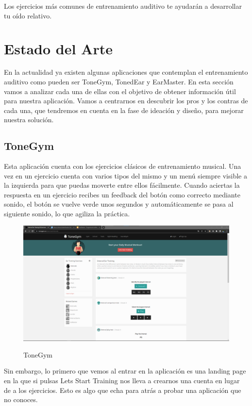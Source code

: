 \documentclass[12pt,twoside,titlepage]{report}
\begin{document}
Los ejercicios más comunes de entrenamiento auditivo te ayudarán a desarrollar tu oído relativo.

\section{Estado del Arte}

En la actualidad ya existen algunas aplicaciones que contemplan el entrenamiento auditivo como pueden ser ToneGym, TonedEar y EarMaster. En esta sección vamos a analizar cada una de ellas con el objetivo de obtener información útil para nuestra aplicación. Vamos a centrarnos en descubrir los pros y los contras de cada una, que tendremos en cuenta en la fase de ideación y diseño, para mejorar nuestra solución.

\subsection{ToneGym}

Esta aplicación cuenta con los ejercicios clásicos de entrenamiento musical. Una vez en un ejercicio cuenta con varios tipos del mismo y un menú siempre visible a la izquierda para que puedas moverte entre ellos fácilmente. Cuando aciertas la respuesta en un ejercicio recibes un feedback del botón como correcto mediante sonido, el botón se vuelve verde unos segundos y automáticamente se pasa al siguiente sonido, lo que agiliza la práctica.

\begin{figure}[H] 
    \includegraphics[scale=0.25]{Estado del Arte/tonegym}
    \centering
    \label{fig:tonegym}
    \caption{ToneGym}
\end{figure}

Sin embargo, lo primero que vemos al entrar en la aplicación es una landing page en la que si pulsas Lets Start Training nos lleva a crearnos una cuenta en lugar de a los ejercicios. Esto es algo que echa para atrás a probar una aplicación que no conoces. 
\end{document}

